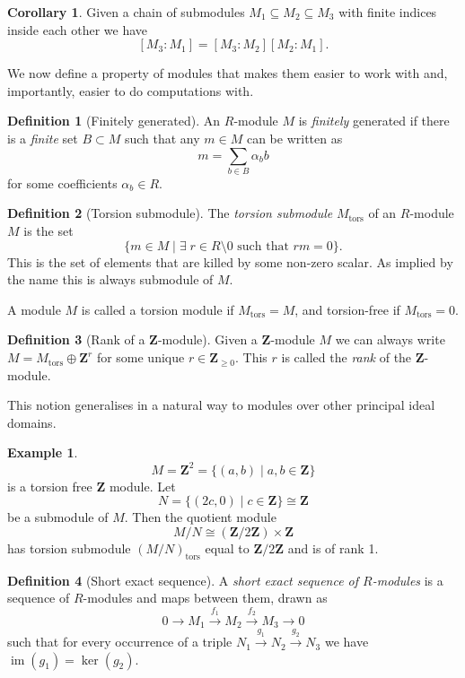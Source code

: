 \documentclass[12pt,a4paper,abstracton,bibtotoc]{scrreprt}
\theoremstyle{definition}
\newtheorem{cor}{Corollary}
\newtheorem{defn}{Definition}
\newtheorem{ex}{Example}
\newcommand{\ZZ}{\mathbf{Z}}
\DeclareMathOperator{\im}{im}
\begin{document}
\begin{cor}
\label{cor:indexmult}
Given a chain of submodules $M_1 \subseteq M_2 \subseteq M_3$ with finite indices inside each other we have
\[
[M_3:M_1] = [M_3:M_2][M_2:M_1].
\]
\end{cor}

\minisec{}
We now define a property of modules that makes them easier to work with and, importantly, easier to do computations with.

\begin{defn}[Finitely generated]
An $R$-module $M$ is \emph{finitely} generated if there is a \emph{finite} set $B\subset M$ such that any $m\in M$ can be written as
\[m = \sum_{b\in B} \alpha_b b\]
for some coefficients $\alpha_b \in R$.
\end{defn}

\begin{defn}[Torsion submodule]
The \emph{torsion submodule} $M_\text{tors}$ of an $R$-module $M$ is the set
\[
\{m\in M \mid \exists\; r \in R\setminus 0 \text{ such that } rm = 0\}.
\]
This is the set of elements that are killed by some non-zero scalar.
As implied by the name this is always submodule of $M$.
\end{defn}

A module $M$ is called a torsion module if $M_\text{tors} = M$, and torsion-free if $M_\text{tors} = 0$.

\begin{defn}[Rank of a $\ZZ$-module]
Given a $\ZZ$-module $M$ we can always write $M = M_\text{tors} \oplus \ZZ^r$ for some unique $r\in \ZZ_{\ge 0}$.
This $r$ is called the \emph{rank} of the $\ZZ$-module.
\end{defn}

This notion generalises in a natural way to modules over other principal ideal domains.

\begin{ex}
\[M = \ZZ^2 = \{(a,b)\mid a,b\in \ZZ\}\]
is a torsion free $\ZZ$ module. Let
\[N = \{(2c,0) \mid c\in\ZZ\} \cong \ZZ\]
be a submodule of $M$.
Then the quotient module
\[M/N \cong (\ZZ/2\ZZ)\times \ZZ\]
has torsion submodule $(M/N)_\text{tors}$ equal to $\ZZ/2\ZZ$ and is of rank 1.
\end{ex}

\begin{defn}[Short exact sequence]
A \emph{short exact sequence of $R$-modules} is a sequence of $R$-modules and maps between them, drawn as
\[
0 \to M_1 \xrightarrow{f_1} M_2 \xrightarrow{f_2} M_3 \to 0
\]
such that for every occurrence of a triple $N_1 \xrightarrow{g_1} N_2 \xrightarrow{g_2} N_3$ we have $\im(g_1) = \ker(g_2)$.
\end{defn}
\end{document}
